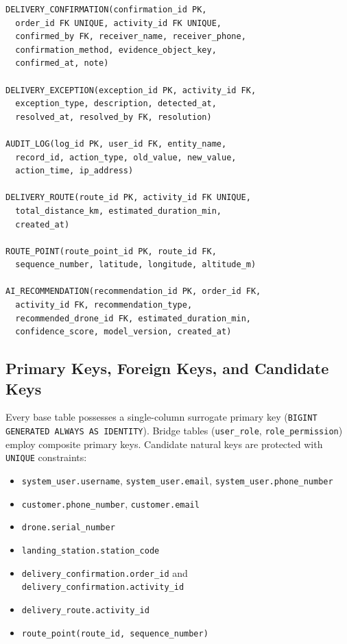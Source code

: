 \begin{verbatim}
DELIVERY_CONFIRMATION(confirmation_id PK,
  order_id FK UNIQUE, activity_id FK UNIQUE,
  confirmed_by FK, receiver_name, receiver_phone,
  confirmation_method, evidence_object_key,
  confirmed_at, note)

DELIVERY_EXCEPTION(exception_id PK, activity_id FK,
  exception_type, description, detected_at,
  resolved_at, resolved_by FK, resolution)

AUDIT_LOG(log_id PK, user_id FK, entity_name,
  record_id, action_type, old_value, new_value,
  action_time, ip_address)

DELIVERY_ROUTE(route_id PK, activity_id FK UNIQUE,
  total_distance_km, estimated_duration_min,
  created_at)

ROUTE_POINT(route_point_id PK, route_id FK,
  sequence_number, latitude, longitude, altitude_m)

AI_RECOMMENDATION(recommendation_id PK, order_id FK,
  activity_id FK, recommendation_type,
  recommended_drone_id FK, estimated_duration_min,
  confidence_score, model_version, created_at)
\end{verbatim}

\subsection{Primary Keys, Foreign Keys, and Candidate Keys}

Every base table possesses a single-column surrogate primary key (\texttt{BIGINT GENERATED ALWAYS AS IDENTITY}). Bridge tables (\texttt{user\_role}, \texttt{role\_permission}) employ composite primary keys. Candidate natural keys are protected with \texttt{UNIQUE} constraints:
\begin{itemize}
    \item \texttt{system\_user.username}, \texttt{system\_user.email}, \texttt{system\_user.phone\_number}
    \item \texttt{customer.phone\_number}, \texttt{customer.email}
    \item \texttt{drone.serial\_number}
    \item \texttt{landing\_station.station\_code}
    \item \texttt{delivery\_confirmation.order\_id} and \texttt{delivery\_confirmation.activity\_id}
    \item \texttt{delivery\_route.activity\_id}
    \item \texttt{route\_point(route\_id, sequence\_number)}
\end{itemize}

